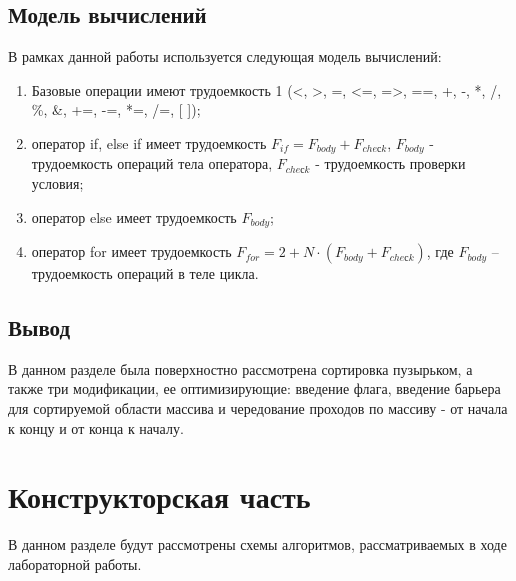 \documentclass[a4paper, 14pt]{article}
\begin{document}
		\subsection{Модель вычислений}

			В рамках данной работы используется следующая модель вычислений:
			\begin{enumerate}
  				\item Базовые операции имеют трудоемкость 1 (<, >, =, <=, =>, ==, +, -, *, /, \%, \&, +=, -=, *=, /=,  [ ]);
				\item оператор if, else if имеет трудоемкость $F_{if} = F_{body} + F_{cheсk}$,  $F_{body}$ - трудоемкость операций тела оператора,  $F_{cheсk}$ - трудоемкость проверки условия;
				\item оператор else имеет трудоемкость $F_{body}$;
				\item оператор for имеет трудоемкость  $F_{for} = 2 + N \cdot (F_{body} + F_{cheсk})$, где $F_{body}$ – трудоемкость операций в теле цикла.
\end{enumerate}


    \subsection{Вывод}
    В данном разделе была поверхностно рассмотрена сортировка пузырьком, а также три модификации, ее оптимизирующие: введение флага, введение барьера для сортируемой области массива и чередование проходов по массиву - от начала к концу и от конца к началу.
    \newpage
        \section{Конструкторская часть}
        В данном разделе будут рассмотрены схемы алгоритмов, рассматриваемых в ходе лабораторной работы.
		        
\end{document}
